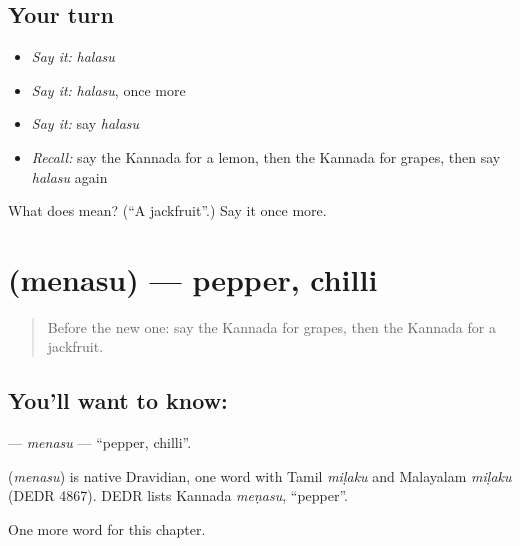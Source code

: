 \subsection*{Your turn}
\begin{itemize}
\raggedright
  \item \emph{Say it:} \emph{halasu}
  \item \emph{Say it:} \emph{halasu}, once more
  \item \emph{Say it:} say \emph{halasu}
  \item \emph{Recall:} say the Kannada for a lemon, then the Kannada for grapes, then say \emph{halasu} again
\end{itemize}

\begin{tcolorbox}[breakable,colback=teal!4,colframe=teal!35!black,title={Before you move on}]
What does  mean? (\textquotedblleft{}A jackfruit\textquotedblright{}.) Say it once more.
\end{tcolorbox}
\section[\texorpdfstring{\kn{ಮೆಣಸು} (menasu)}{ಮೆಣಸು (menasu)}]{ (menasu) — pepper, chilli}

\label{lesson:KA-C126-menasu}



\begin{quote}
Before the new one: say the Kannada for grapes, then the Kannada for a jackfruit.
\end{quote}

\subsection*{You'll want to know: }
\textbf{} — \emph{menasu} — \textquotedblleft{}pepper, chilli\textquotedblright{}.

\begin{cousinweb}
\textbf{} (\emph{menasu}) is native Dravidian, one word with Tamil \emph{miḷaku} and Malayalam \emph{miḷaku} (DEDR 4867). DEDR lists Kannada \emph{meṇasu}, \textquotedblleft{}pepper\textquotedblright{}.
\end{cousinweb}

\begin{grammarlens}[title={What you've built}]
One more word for this chapter.
\end{grammarlens}

